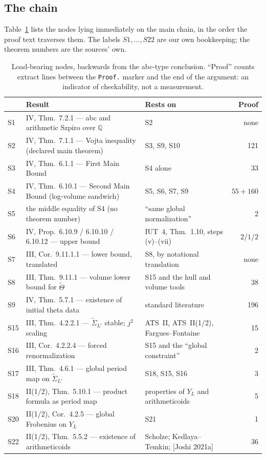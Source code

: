 \documentclass[11pt,a4paper]{article}
\theoremstyle{definition}
\theoremstyle{remark}
\begin{document}
\subsection{The chain}

Table~\ref{tab:spine} lists the nodes lying immediately on the main chain, in the
order the proof text traverses them. The labels $S1,\dots,S22$ are our own
bookkeeping; the theorem numbers are the sources' own.

\begin{table}[htbp]
\centering
\footnotesize
\setlength{\tabcolsep}{4pt}
\caption{Load-bearing nodes, backwards from the abc-type conclusion. ``Proof''
counts extract lines between the \texttt{Proof.} marker and the end of the
argument: an indicator of checkability, not a measurement.}
\label{tab:spine}
\begin{tabularx}{\linewidth}{@{}l >{\raggedright\arraybackslash}X >{\raggedright\arraybackslash}X r@{}}
\toprule
 & Result & Rests on & Proof \\
\midrule
S1  & IV, Thm.~7.2.1 --- abc and arithmetic Szpiro over $\mathbb{Q}$ & S2 & none \\
S2  & IV, Thm.~7.1.1 --- Vojta inequality (declared main theorem) & S3, S9, S10 & 121 \\
S3  & IV, Thm.~6.1.1 --- First Main Bound & S4 alone & 33 \\
S4  & IV, Thm.~6.10.1 --- Second Main Bound (log-volume sandwich) & S5, S6, S7, S9 & $55{+}160$ \\
S5  & the middle equality of S4 (no theorem number) & ``same global normalization'' & 2 \\
S6  & IV, Prop.~6.10.9 / 6.10.10 / 6.10.12 --- upper bound & IUT~4, Thm.~1.10, steps (v)--(vii) & $2/1/2$ \\
S7  & III, Cor.~9.11.1.1 --- lower bound, translated & S8, by notational translation & none \\
S8  & III, Thm.~9.11.1 --- volume lower bound for $\widetilde{\Theta}$ & S15 and the hull and volume tools & 38 \\
S9  & IV, Thm.~5.7.1 --- existence of initial theta data & standard literature & 196 \\
S15 & III, Thm.~4.2.2.1 --- $\widetilde{\Sigma}_{L'}$ stable; $j^2$ scaling & ATS~II, ATS~II(1/2), Fargues--Fontaine & 15 \\
S16 & III, Cor.~4.2.2.4 --- forced renormalization & S15 and the ``global constraint'' & 2 \\
S17 & III, Thm.~4.6.1 --- global period map on $\widetilde{\Sigma}_{L'}$ & S18, S15, S16 & 3 \\
S18 & II(1/2), Thm.~5.10.1 --- product formula as period map & properties of $Y_L$ and arithmeticoids & 5 \\
S20 & II(1/2), Cor.~4.2.5 --- global Frobenius on $Y_L$ & S21 & 1 \\
S22 & II(1/2), Thm.~5.5.2 --- existence of arithmeticoids & Scholze; Kedlaya--Temkin; [Joshi 2021a] & 36 \\
\bottomrule
\end{tabularx}
\end{table}
\end{document}
